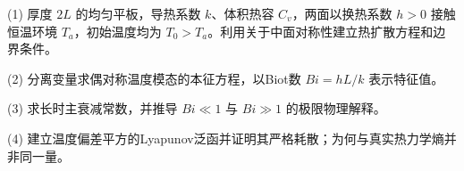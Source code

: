(1) 厚度 \(2L\) 的均匀平板，导热系数 \(k\)、体积热容 \(C_v\)，两面以换热系数 \(h>0\) 接触恒温环境 \(T_a\)，初始温度均为 \(T_0>T_a\)。利用关于中面对称性建立热扩散方程和边界条件。

(2) 分离变量求偶对称温度模态的本征方程，以Biot数 \(Bi=hL/k\) 表示特征值。

(3) 求长时主衰减常数，并推导 \(Bi\ll1\) 与 \(Bi\gg1\) 的极限物理解释。

(4) 建立温度偏差平方的Lyapunov泛函并证明其严格耗散；为何与真实热力学熵并非同一量。

